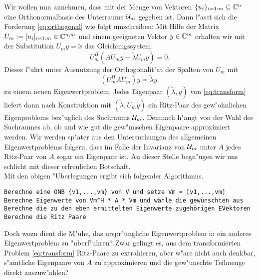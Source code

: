 Wir wollen nun annehmen, dass mit der Menge von Vektoren $\{u_i\}_{i=1:m}\subseteq \mathbb{C}^n$ eine Orthonormalbasis
des Unterraums $\mathcal{U}_m$ gegeben ist. Dann l"asst sich die Forderung \eqref{eq:orthogonal} wie folgt
umschreiben: Mit Hilfe der Matrix
$U_m :=[u_i]_{i=1:m}\in\mathbb{C}^{n,m}$ und einem geeigneten Vektor $y\in\mathbb{C}^m$ erhalten wir
mit der Substitution $U_m y = \widetilde{x}$ das Gleichungssystem
\[
U_m^H(AU_m y - \widetilde{\lambda} U_m y) = 0.
\]
Dieses f"uhrt unter Ausnutzung der Orthogonalit"at der Spalten von $U_m$ mit%
\begin{equation}\label{eq:transform}
(U_m^H A U_m) y = \widetilde{\lambda}y.
\end{equation}
zu einem neuen Eigenwertproblem. Jedes Eigenpaar $(\widetilde{\lambda},y)$ von \eqref{eq:transform}
liefert dann nach Konstruktion mit $(\widetilde{\lambda}, U_m y)$ ein Ritz-Paar des gew"ohnlichen
Eigenproblems bez"uglich des Suchraums $\mathcal{U}_m$. Demnach h"angt von der Wahl
des Suchraumes ab, ob und wie gut die gew"unschen Eigenpaare approximiert werden.
Wir werden sp"ater aus den Untersuchungen des allgemeinen Eigenwertproblems folgern,
dass im Falle der Invarianz von $\mathcal{U}_m$ unter $A$ jedes Ritz-Paar von $A$ sogar ein Eigenpaar ist.
An dieser Stelle begn"ugen wir uns schlicht mit dieser erfreulichen Botschaft.\\

Mit den obigen "Uberlegungen ergibt sich folgender Algorithmus.

\begin{lstlisting}[caption = Rayleigh-Ritz-Verfahren (Vgl. Saad Algo. 4.5), captionpos=b]
Berechne eine ONB {v1,...,vm} von V und setze Vm = [v1,...,vm]
Berechne Eigenwerte von Vm^H * A * Vm und wähle die gewünschten aus
Berechne die zu den eben ermittelten Eigenwerte zugehörigen EVektoren
Berechne die Ritz Paare
\end{lstlisting}

Doch wozu dient die M"uhe, das urspr"ungliche Eigenwertproblem in ein anderes
Eigenwertproblem zu "uberf"uhren? Zwar gelingt es, aus dem transformierten Problem
\eqref{eq:transform} Ritz-Paare zu extrahieren, aber w"are nicht auch denkbar,
s"amtliche Eigenpaare von $A$ zu approximieren und die gew"unschte Teilmenge
direkt auszuw"ahlen?\\

